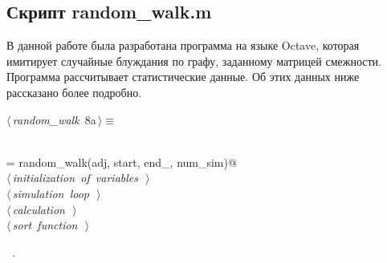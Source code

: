 \documentclass{article}
\begin{document}
\subsection{Скрипт random_walk.m}
В данной работе была разработана программа на языке Octave, которая имитирует случайные блуждания по графу, заданному матрицей смежности. Программа рассчитывает статистические данные. Об этих данных ниже рассказано более подробно. 


\begin{flushleft} \small
\begin{minipage}{\linewidth}\label{scrap1}\raggedright\small
{} $\langle\,${\itshape random_walk}\nobreak\ {\footnotesize {8a}}$\,\rangle\equiv$
\vspace{-1ex}
\begin{list}{}{} \item
\mbox{}\verb@@\\
\mbox{} = random_walk(adj, start, end_, num_sim)@\\
\mbox{}\verb@@\hbox{$\langle\,${\itshape initialization of variables}\nobreak\ {\footnotesize {}}$\,\rangle$}\verb@@\\
\mbox{}\verb@@\hbox{$\langle\,${\itshape simulation loop}\nobreak\ {\footnotesize {}}$\,\rangle$}\verb@@\\
\mbox{}\verb@@\hbox{$\langle\,${\itshape calculation}\nobreak\ {\footnotesize {}}$\,\rangle$}\verb@@\\
\mbox{}\verb@@\hbox{$\langle\,${\itshape sort function}\nobreak\ {\footnotesize {}}$\,\rangle$}\verb@@\\
\mbox{}\verb@@{\NWsep}
\end{list}
\vspace{-1.5ex}
\footnotesize
\begin{list}{}{\setlength{\itemsep}{-\parsep}\setlength{\itemindent}{-\leftmargin}}
\item \NWtxtMacroRefIn\ .

\item{}
\end{list}
\end{minipage}\vspace{4ex}
\end{flushleft}
\end{document}
